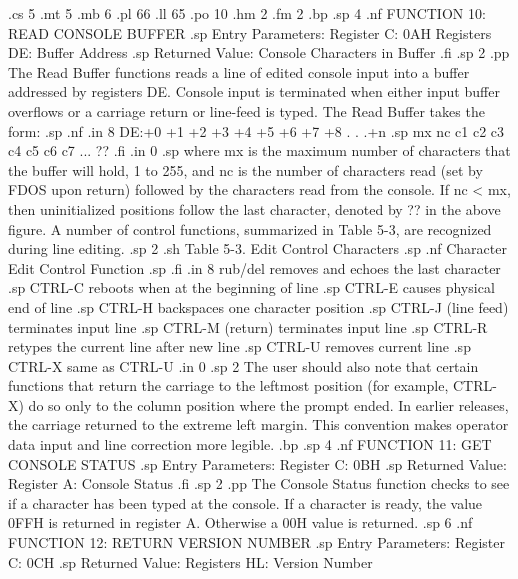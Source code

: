 .cs 5
.mt 5
.mb 6
.pl 66
.ll 65
.po 10
.hm 2
.fm 2
.bp
.sp 4
.nf
                FUNCTION 10:  READ CONSOLE BUFFER
.sp
                Entry Parameters:
                      Register C:  0AH
                    Registers DE:  Buffer Address
.sp
                Returned Value:
                     Console Characters in Buffer
.fi
.sp 2
.pp
The Read Buffer functions reads a line of edited console input 
into a buffer addressed by registers DE.  Console input is 
terminated when either input buffer overflows or a carriage return 
or line-feed is typed.  The Read Buffer takes the form:
.sp
.nf
.in 8
DE:+0 +1 +2 +3 +4 +5 +6 +7 +8 . . .+n
.sp
mx nc c1 c2 c3 c4 c5 c6 c7  ... ??
.fi
.in 0
.sp
where mx is the maximum number of characters that the buffer will 
hold, 1 to 255, and nc is the number of characters read (set by 
FDOS upon return) followed by the characters read from the 
console.  If nc < mx, then uninitialized positions follow the 
last character, denoted by ?? in the above figure.  A number of 
control functions, summarized in Table 5-3, are recognized during 
line editing.
.sp 2
.sh
               Table 5-3.  Edit Control Characters
.sp
.nf
       Character             Edit Control Function
.sp
.fi
.in 8
rub/del     removes and echoes the last character
.sp
CTRL-C      reboots when at the beginning of line
.sp
CTRL-E      causes physical end of line
.sp
CTRL-H      backspaces one character position
.sp
CTRL-J      (line feed) terminates input line
.sp
CTRL-M      (return) terminates input line
.sp
CTRL-R      retypes the current line after new line
.sp
CTRL-U      removes current line
.sp
CTRL-X      same as CTRL-U
.in 0
.sp 2
The user should also note that certain functions that return the 
carriage to the leftmost position (for example, CTRL-X) do so only to the 
column position where the prompt ended.  In earlier releases, the 
carriage returned to the extreme left margin.  This convention 
makes operator data input and line correction more legible.
.bp
.sp 4
.nf
                FUNCTION 11:  GET CONSOLE STATUS
.sp
                Entry Parameters:
                      Register C:  0BH
.sp
                Returned Value:
                      Register A:  Console Status
.fi
.sp 2
.pp
The Console Status function checks to see if a character has been 
typed at the console.  If a character is ready, the value 0FFH is 
returned in register A.  Otherwise a 00H value is returned.
.sp 6
.nf
               FUNCTION 12:  RETURN VERSION NUMBER
.sp
               Entry Parameters:
                     Register C:  0CH
.sp
               Returned Value:
                   Registers HL:  Version Number
